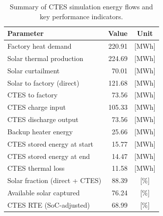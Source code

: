\renewcommand{\arraystretch}{1.2}
\begin{table}[h]
\centering
\begin{tabular}{l|r c}
\hline
Parameter & Value & Unit \\
\hline
Factory heat demand & 220.91 & [MWh] \\
Solar thermal production & 224.69 & [MWh] \\
Solar curtailment & 70.01 & [MWh] \\
Solar to factory (direct) & 121.68 & [MWh] \\
CTES to factory & 73.56 & [MWh] \\
CTES charge input & 105.33 & [MWh] \\
CTES discharge output & 73.56 & [MWh] \\
Backup heater energy & 25.66 & [MWh] \\
CTES stored energy at start & 15.77 & [MWh] \\
CTES stored energy at end & 14.47 & [MWh] \\
CTES thermal loss & 11.58 & [MWh] \\
\hline
Solar fraction (direct + CTES) & 88.39 & [\%] \\
Available solar captured & 76.24 & [\%] \\
CTES RTE (SoC-adjusted) & 68.99 & [\%] \\
\hline
\end{tabular}
\caption{Summary of CTES simulation energy flows and key performance indicators.}
\label{tab:ctes-simulation-summary}
\end{table}
